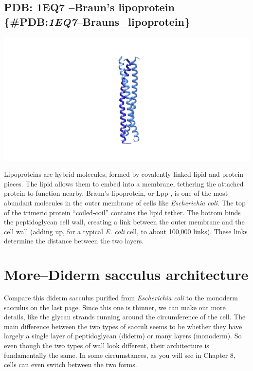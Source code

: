 \documentclass[]{tufte-book}
\begin{document}
\subsection{\texorpdfstring{PDB: 1EQ7 --Braun's lipoprotein
\{\#PDB:\emph{1EQ7}--Brauns\_lipoprotein\}}{PDB: 1EQ7 --Braun's lipoprotein \{\#PDB:1EQ7--Brauns\_lipoprotein\}}}\label{pdb-1eq7-brauns-lipoprotein-pdb1eq7brauns_lipoprotein}

\includegraphics{img/schematics/2_3_1}

Lipoproteins are hybrid molecules, formed by covalently linked lipid and
protein pieces. The lipid allows them to embed into a membrane,
tethering the attached protein to function nearby. Braun's lipoprotein,
or Lpp \citet{shu2000}, is one of the most abundant molecules in the
outer membrane of cells like \emph{Escherichia coli}. The top of the
trimeric protein ``coiled-coil'' contains the lipid tether. The bottom
binds the peptidoglycan cell wall, creating a link between the outer
membrane and the cell wall (adding up, for a typical \emph{E. coli}
cell, to about 100,000 links). These links determine the distance
between the two layers.

\hypertarget{morediderm-sacculus-architecture}{\section{More--Diderm
sacculus architecture}\label{morediderm-sacculus-architecture}}

Compare this diderm sacculus purified from \emph{Escherichia coli} to
the monoderm sacculus on the last page. Since this one is thinner, we
can make out more details, like the glycan strands running around the
circumference of the cell. The main difference between the two types of
sacculi seems to be whether they have largely a single layer of
peptidoglycan (diderm) or many layers (monoderm). So even though the two
types of wall look different, their architecture is fundamentally the
same. In some circumstances, as you will see in Chapter 8, cells can
even switch between the two forms.
\end{document}
